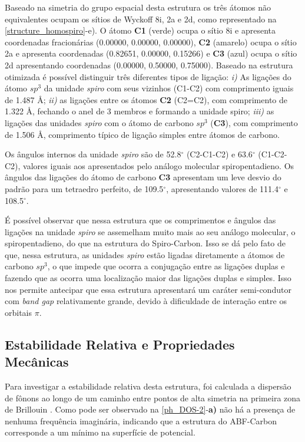 		
		Baseado na simetria do grupo espacial desta estrutura os três átomos não equivalentes ocupam os sítios de Wyckoff 8i, 2a e 2d, como representado na \autoref{structure_homospiro}-e). O átomo \textbf{C1} (verde) ocupa o sítio 8i e apresenta coordenadas fracionárias (0.00000, 0.00000, 0.00000), \textbf{C2} (amarelo) ocupa o sítio 2a e apresenta coordenadas (0.82651, 0.00000, 0.15266) e \textbf{C3} (azul) ocupa o sítio 2d apresentando coordenadas (0.00000, 0.50000, 0.75000). Baseado na estrutura otimizada é possível distinguir três diferentes tipos de ligação: \textit{i)} As ligações do átomo $sp^3$ da unidade \textit{spiro} com seus vizinhos (C1-C2) com comprimento iguais de 1.487 Å; \textit{ii)} as ligações entre os átomos \textbf{C2} (C2=C2), com comprimento de 1.322 Å, fechando o anel de 3 membros e formando a unidade spiro; \textit{iii)} as ligações das unidades \textit{spiro} com o átomo de carbono $sp^3$ (\textbf{C3}), com comprimento de 1.506 \AA, comprimento típico de ligação simples entre átomos de carbono.
		
		Os ângulos internos da unidade \textit{spiro} são de 52.8$^\circ$ (C2-C1-C2) e 63.6$^\circ$ (C1-C2-C2), valores iguais aos apresentados pelo análogo molecular spiropentadieno. Os ângulos das ligações do átomo de carbono \textbf{C3} apresentam um leve desvio do padrão para um tetraedro perfeito, de 109.5$^\circ$, apresentando valores de 111.4$^\circ$ e 108.5$^\circ$.     
		
		É possível observar que nessa estrutura que os comprimentos e ângulos das ligações na unidade \textit{spiro} se assemelham muito mais ao seu análogo molecular, o spiropentadieno, do que na estrutura do Spiro-Carbon. Isso se dá pelo fato de que, nessa estrutura, as unidades \textit{spiro} estão ligadas diretamente a átomos de carbono $sp^3$, o que impede que ocorra a conjugação entre as ligações duplas e fazendo que as ocorra uma localização maior das ligações duplas e simples. Isso nos permite antecipar que essa estrutura apresentará um caráter semi-condutor com \textit{band gap} relativamente grande, devido à dificuldade de interação entre os orbitais $\pi$. 
		
	\subsection{Estabilidade Relativa e Propriedades Mecânicas}
	
		Para investigar a estabilidade relativa desta estrutura, foi calculada a dispersão de fônons ao longo de um caminho entre pontos de alta simetria na primeira zona de Brillouin \cite{bradley2010mathematical}. Como pode ser observado na \autoref{ph_DOS-2}-\textbf{a)} não há a presença de nenhuma frequência imaginária, indicando que a estrutura do ABF-Carbon corresponde a um mínimo na superfície de potencial. 
	
